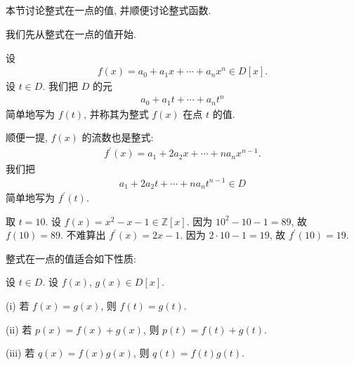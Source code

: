 \subsection*{\ValueOfAPolynomialAtAPoint}
\markright{\ValueOfAPolynomialAtAPoint}

本节讨论整式在一点的值, 并顺便讨论整式函数.

我们先从整式在一点的值开始.

\begin{definition}
    设
    \begin{align*}
        f(x) = a_0 + a_1 x + \cdots + a_n x^n \in D[x].
    \end{align*}
    设 $t \in D$. 我们把 $D$ 的元
    \begin{align*}
        a_0 + a_1 t + \cdots + a_n t^n
    \end{align*}
    简单地写为 $f(t)$, 并称其为整式 $f(x)$ 在点  $t$ 的值.

    顺便一提, $f(x)$ 的流数也是整式:
    \begin{align*}
        f^{\prime} (x) = a_1 + 2a_2 x + \cdots + na_n x^{n-1}.
    \end{align*}
    我们把
    \begin{align*}
        a_1 + 2a_2 t + \cdots + na_n t^{n-1} \in D
    \end{align*}
    简单地写为 $f^{\prime} (t)$.
\end{definition}

\begin{example}
    取 $t = 10$. 设 $f(x) = x^2 - x - 1 \in \mathbb{Z}[x]$. 因为 $10^2 - 10 - 1 = 89$, 故 $f(10) = 89$. 不难算出 $f^{\prime} (x) = 2x - 1$. 因为 $2 \cdot 10 - 1 = 19$, 故 $f^{\prime} (10) = 19$.
\end{example}

整式在一点的值适合如下性质:
\begin{proposition}
    设 $t \in D$. 设 $f(x)$, $g(x) \in D[x]$.

    (i) 若 $f(x) = g(x)$, 则 $f(t) = g(t)$.

    (ii) 若 $p(x) = f(x) + g(x)$, 则 $p(t) = f(t) + g(t)$.

    (iii) 若 $q(x) = f(x) g(x)$, 则 $q(t) = f(t) g(t)$.
\end{proposition}

